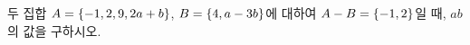두 집합 $A=\{-1{,}\mkern3mu\mathopen{}2{,}\mkern3mu\mathopen{}9{,}\mkern3mu\mathopen{}2a+b\}$, $B=\{4{,}\mkern3mu\mathopen{}a-3b\}$에 대하여 $A-B=\{-1{,}\mkern3mu\mathopen{}2\}$일 때, $ab$의 값을 구하시오. 
